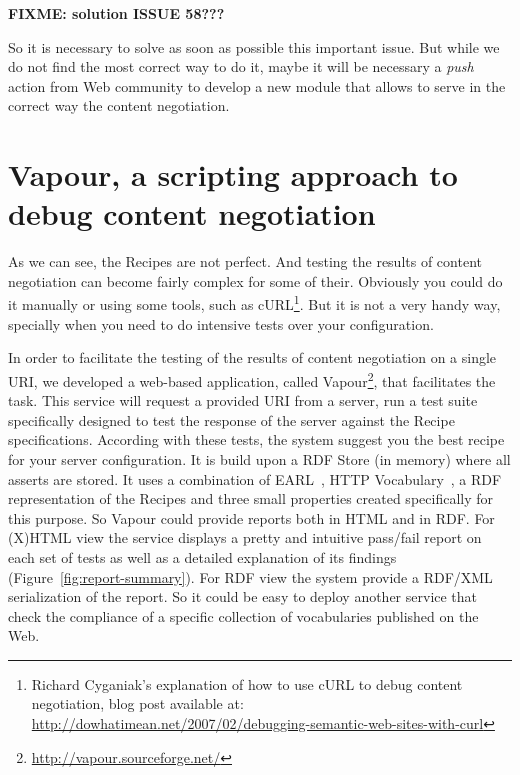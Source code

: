 \textbf{FIXME: solution ISSUE 58???}

So it is necessary to solve as soon as possible this important issue. 
But while we do not find the most correct way to do it, maybe it will be 
necessary a \textit{push} action from Web community to develop a new
module that allows to serve in the correct way the content negotiation.

\section{Vapour, a scripting approach to debug content negotiation} %

As we can see, the Recipes are not perfect. And testing the results of content 
negotiation can become fairly complex for some of their. Obviously you could do 
it manually or using some tools, such as 
cURL\footnote{Richard Cyganiak's explanation of how to use cURL to debug content negotiation, 
blog post available at: \url{http://dowhatimean.net/2007/02/debugging-semantic-web-sites-with-curl}}.
But it is not a very handy way, specially when you need to do intensive tests over your 
configuration.

In order to facilitate the testing of the results of content negotiation on a single 
URI, we developed a web-based application, called Vapour\footnote{\url{http://vapour.sourceforge.net/}}, 
that facilitates the task. This service will request a provided URI from a server, 
run a test suite specifically designed to test the response of the server against 
the Recipe specifications. According with these tests, the system suggest you the 
best recipe for your server configuration. It is build upon a RDF Store (in memory) 
where all asserts are stored. It uses a combination of EARL~\cite{EARL}, HTTP
Vocabulary~\cite{Koch2007}, a RDF representation of the Recipes and three small 
properties created specifically for this purpose. So Vapour could provide 
reports both in HTML and in RDF. For (X)HTML view the service displays a 
pretty and intuitive pass/fail report on each set of tests as  well as a detailed 
explanation of its  findings (Figure~\ref{fig:report-summary}).
For RDF view %
the system provide a RDF/XML serialization of the report. So it could be easy 
to deploy another service that check the compliance of a specific collection 
of vocabularies published on the Web.

